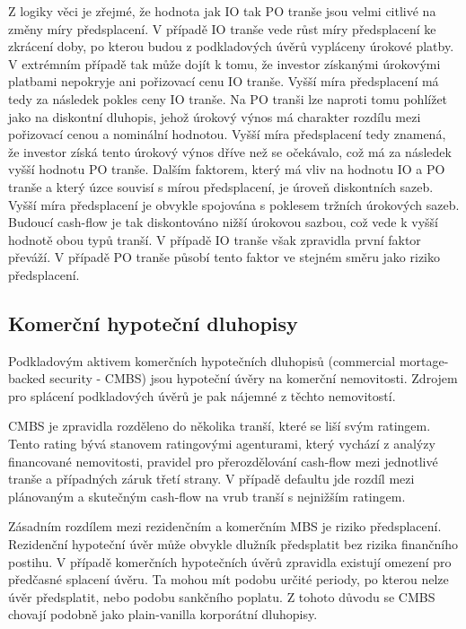 \documentclass[a4paper]{book}
\begin{document}
Z logiky věci je zřejmé, že hodnota jak IO tak PO tranše jsou velmi citlivé na změny míry předsplacení. V případě IO tranše vede růst míry předsplacení ke zkrácení doby, po kterou budou z podkladových úvěrů vypláceny úrokové platby. V extrémním případě tak může dojít k tomu, že investor získanými úrokovými platbami nepokryje ani pořizovací cenu IO tranše. Vyšší míra předsplacení má tedy za následek pokles ceny IO tranše. Na PO tranši lze naproti tomu pohlížet jako na diskontní dluhopis, jehož úrokový výnos má charakter rozdílu mezi pořizovací cenou a nominální hodnotou. Vyšší míra předsplacení tedy znamená, že investor získá tento úrokový výnos dříve než se očekávalo, což má za následek vyšší hodnotu PO tranše. Dalším faktorem, který má vliv na hodnotu IO a PO tranše a který úzce souvisí s mírou předsplacení, je úroveň diskontních sazeb. Vyšší míra předsplacení je obvykle spojována s poklesem tržních úrokových sazeb. Budoucí cash-flow je tak diskontováno nižší úrokovou sazbou, což vede k vyšší hodnotě obou typů tranší. V případě IO tranše však zpravidla první faktor převáží. V případě PO tranše působí tento faktor ve stejném směru jako riziko předsplacení.

\subsection{Komerční hypoteční dluhopisy}

Podkladovým aktivem komerčních hypotečních dluhopisů (commercial mortage-backed security - CMBS) jsou hypoteční úvěry na komerční nemovitosti. Zdrojem pro splácení podkladových úvěrů je pak nájemné z těchto nemovitostí.

CMBS je zpravidla rozděleno do několika tranší, které se liší svým ratingem. Tento rating bývá stanovem ratingovými agenturami, který vychází z analýzy financované nemovitosti, pravidel pro přerozdělování cash-flow mezi jednotlivé tranše a případných záruk třetí strany. V případě defaultu jde rozdíl mezi plánovaným a skutečným cash-flow na vrub tranší s nejnižším ratingem.

Zásadním rozdílem mezi rezidenčním a komerčním MBS je riziko předsplacení. Rezidenční hypoteční úvěr může obvykle dlužník předsplatit bez rizika finančního postihu. V případě komerčních hypotečních úvěrů zpravidla existují omezení pro předčasné splacení úvěru. Ta mohou mít podobu určité periody, po kterou nelze úvěr předsplatit, nebo podobu sankčního poplatu. Z tohoto důvodu se CMBS chovají podobně jako plain-vanilla korporátní dluhopisy.
\end{document}
